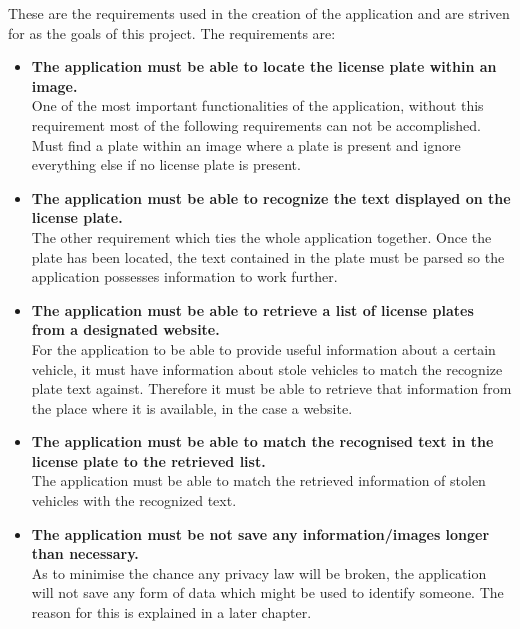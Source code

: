 
These are the requirements used in the creation of the application and are striven for as the goals of this project. The requirements are:

\begin{itemize}
    \item{\textbf{The application must be able to locate the license plate within an image.} \\
        One of the most important functionalities of the application, without this requirement most of the following requirements can not be accomplished. Must find a plate within an image where a plate is present and ignore everything else if no license plate is present.        
    }

    \item{\textbf{The application must be able to recognize the text displayed on the license plate.} \\
        The other requirement which ties the whole application together. Once the plate has been located, the text contained in the plate must be parsed so the application possesses information to work further. 
    }

    \item{\textbf{The application must be able to retrieve a list of license plates from a designated website.} \\
         For the application to be able to provide useful information about a certain vehicle, it must have information about stole vehicles to match the recognize plate text against. Therefore it must be able to retrieve that information from the place where it is available, in the case a website.
    }

    \item{\textbf{The application must be able to match the recognised text in the license plate to the retrieved list.} \\
        The application must be able to match the retrieved information of stolen vehicles with the recognized text.
    }

    \item{\textbf{The application must be not save any information/images longer than necessary.} \\
        As to minimise the chance any privacy law will be broken, the application will not save any form of data which might be used to identify someone. The reason for this is explained in a later chapter.
    }
\end{itemize}

